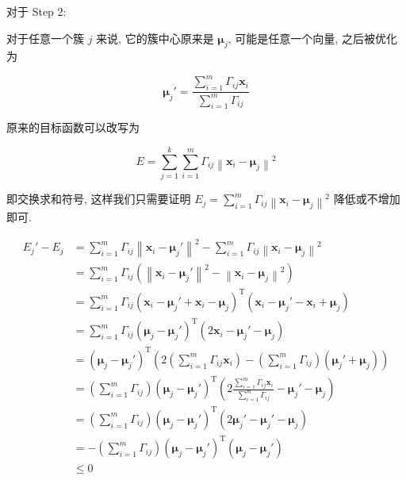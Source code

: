 \documentclass[answers]{exam}  %
\begin{document}
\begin{questions}
\begin{solution}
\begin{enumerate}
            对于 Step 2:

            对于任意一个簇 $j$ 来说, 它的簇中心原来是 $\bm{\mu}_{j}$, 可能是任意一个向量, 之后被优化为

            $$
              \bm{\mu}_j' = \frac{\sum_{i=1}^{m}\Gamma_{ij}\bm{x}_i}{\sum_{i=1}^{m}\Gamma_{ij}}
            $$

            原来的目标函数可以改写为

            $$
              E = \sum_{j=1}^{k}\sum_{i=1}^{m}\Gamma_{ij}\left\| \bm{x}_i - \bm{\mu}_j \right\|^{2}
            $$

            即交换求和符号, 这样我们只需要证明 $\displaystyle E_{j} = \sum_{i=1}^{m}\Gamma_{ij}\left\| \bm{x}_i - \bm{\mu}_j \right\|^{2}$ 降低或不增加即可.

            $$
              \begin{aligned}
                E_j' - E_j & = \sum_{i=1}^{m}\Gamma_{ij}\left\| \bm{x}_i - \bm{\mu}_j' \right\|^{2} - \sum_{i=1}^{m}\Gamma_{ij}\left\| \bm{x}_i - \bm{\mu}_j \right\|^{2}                          \\
                           & = \sum_{i=1}^{m}\Gamma_{ij}(\left\| \bm{x}_i - \bm{\mu}_j' \right\|^{2} - \left\| \bm{x}_i - \bm{\mu}_j \right\|^{2})                                                 \\
                           & = \sum_{i=1}^{m}\Gamma_{ij}(\bm{x}_i - \bm{\mu}_j' + \bm{x}_i - \bm{\mu}_j)^{\mathrm{T}}(\bm{x}_i - \bm{\mu}_j' - \bm{x}_i + \bm{\mu}_j)                              \\
                           & = \sum_{i=1}^{m}\Gamma_{ij}(\bm{\mu}_j - \bm{\mu}_j')^{\mathrm{T}}(2\bm{x}_i - \bm{\mu}_j' - \bm{\mu}_j)                                                              \\
                           & = (\bm{\mu}_j - \bm{\mu}_j')^{\mathrm{T}}(2(\sum_{i=1}^{m}\Gamma_{ij}\bm{x}_i) - (\sum_{i=1}^{m}\Gamma_{ij})(\bm{\mu}_j' + \bm{\mu}_j))                               \\
                           & = (\sum_{i=1}^{m}\Gamma_{ij})(\bm{\mu}_j - \bm{\mu}_j')^{\mathrm{T}}(2\frac{\sum_{i=1}^{m}\Gamma_{ij}\bm{x}_i}{\sum_{i=1}^{m}\Gamma_{ij}} - \bm{\mu}_j' - \bm{\mu}_j) \\
                           & = (\sum_{i=1}^{m}\Gamma_{ij})(\bm{\mu}_j - \bm{\mu}_j')^{\mathrm{T}}(2\bm{\mu}_j' - \bm{\mu}_j' - \bm{\mu}_j)                                                         \\
                           & = -(\sum_{i=1}^{m}\Gamma_{ij})(\bm{\mu}_j - \bm{\mu}_j')^{\mathrm{T}}(\bm{\mu}_j - \bm{\mu}_j')                                                                       \\
                           & \le 0                                                                                                                                                                 \\
              \end{aligned}
            $$


\end{enumerate}
\end{solution}
\end{questions}
\end{document}
